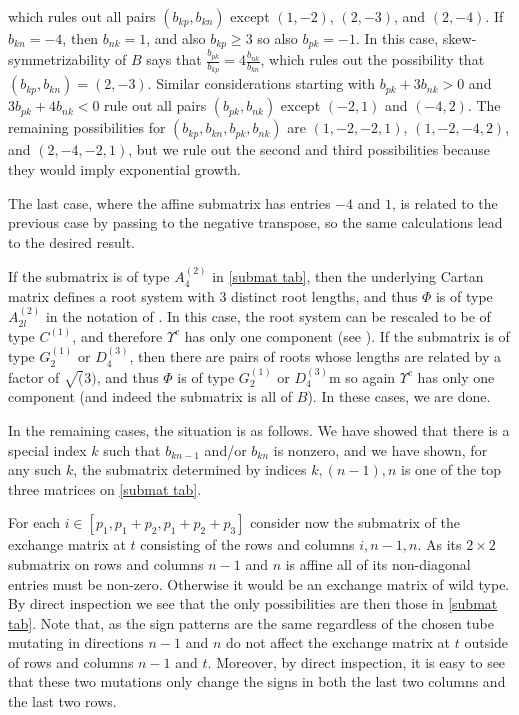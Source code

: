 \documentclass{amsart}
\theoremstyle{definition}
\theoremstyle{remark}
\numberwithin{equation}{section}
\newcommand{\0}{{\mathbf{0}}}
\newcommand{\RSChar}{\Phi}
\newcommand{\RS}{\RSChar}
\newcommand{\RSTChar}{\Upsilon}
\newcommand{\RST}[1]{\RSTChar^{#1}}
\begin{document}
which rules out all pairs $(b_{kp},b_{kn})$ except $(1,-2)$, $(2,-3)$, and $(2,-4)$.
If $b_{kn}=-4$, then $b_{nk}=1$, and also $b_{kp}\ge3$ so also $b_{pk}=-1$.
In this case, skew-symmetrizability of $B$ says that $\frac{b_{pk}}{b_{kp}}=4\frac{b_{nk}}{b_{kn}}$, which rules out the possibility that $(b_{kp},b_{kn})=(2,-3)$.
Similar considerations starting with $b_{pk}+3b_{nk}>0$ and $3b_{pk}+4b_{nk}<0$ rule out all pairs $(b_{pk},b_{nk})$ except $(-2,1)$ and $(-4,2)$.
The remaining possibilities for $(b_{kp},b_{kn},b_{pk},b_{nk})$ are $(1,-2,-2,1)$, $(1,-2,-4,2)$, and $(2,-4,-2,1)$, but we rule out the second and third possibilities because they would imply exponential growth.

The last case, where the affine submatrix has entries $-4$ and $1$, is related to the previous case by passing to the negative transpose, so the same calculations lead to the desired result.

If the submatrix is of type $A_{4}^{(2)}$ in \cref{submat tab}, then the underlying Cartan matrix defines a root system with 3 distinct root lengths, and thus $\RS$ is of type $A_{2l}^{(2)}$ in the notation of \cite[Chapter~4]{Kac}.
In this case, the root system can be rescaled to be of type $C^{(1)}$, and therefore $\RST{c}$ has only one component (see \cite[Table 1]{affdenom}).
If the submatrix is of type $G_{2}^{(1)}$ or $D_{4}^{(3)}$, then there are pairs of roots whose lengths are related by a factor of $\sqrt(3)$, and thus $\RS$ is of type $G_{2}^{(1)}$ or $D_{4}^{(3)}$m so again $\RST{c}$ has only one component (and indeed the submatrix is all of $B$).
In these cases, we are done.

In the remaining cases, the situation is as follows.
We have showed that there is a special index $k$ such that $b_{k{n-1}}$ and/or $b_{kn}$ is nonzero, and we have shown, for any such $k$, the submatrix determined by indices $k,(n-1),n$ is one of the top three matrices on \cref{submat tab}.




  

  For each $i\in[p_1,p_1+p_2,p_1+p_2+p_3]$ consider now the submatrix of the exchange matrix at $t$ consisting of the rows and columns $i,n-1,n$.
  As its $2\times 2$ submatrix on rows and columns $n-1$ and $n$ is affine all of its non-diagonal entries must be non-zero.
  Otherwise it would be an exchange matrix of wild type.
  By direct inspection we see that the only possibilities are then those in \cref{submat tab}.
	Note that, as the sign patterns are the same regardless of the chosen tube mutating in directions $n-1$ and $n$ do not affect the exchange matrix at $t$ outside of rows and columns $n-1$ and $t$.
	Moreover, by direct inspection, it is easy to see that these two mutations only change the signs in both the last two columns and the last two rows.
\end{document}
